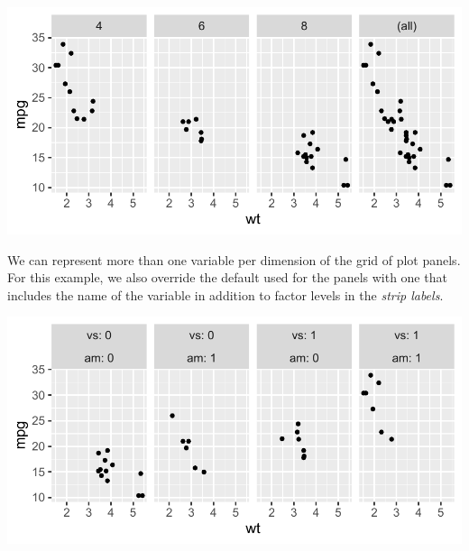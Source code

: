 \documentclass[krantz2]{krantz}\usepackage{knitr}
\begin{document}
\begin{knitrout}\footnotesize
{}\color{fgcolor}\begin{kframe}
\begin{alltt}
 \hlopt{+} \hlstd{(} \hlstd{=}   \hlstd{=} \hlstd{)}
\end{alltt}
\end{kframe}

{\centering \includegraphics[width=.7\textwidth]{figure/pos-facets-06-1} 

}


\end{knitrout}

We can represent more than one variable per dimension of the grid of plot panels. For this example, we also override the default  used for the panels with one that includes the name of the variable in addition to factor levels in the \emph{strip labels}.

\begin{knitrout}\footnotesize
{}\color{fgcolor}\begin{kframe}
\begin{alltt}
 \hlopt{+} \hlstd{(} \hlstd{=}   
\end{alltt}
\end{kframe}

{\centering \includegraphics[width=.7\textwidth]{figure/pos-facets-07-1} 

}


\end{knitrout}
\end{document}
